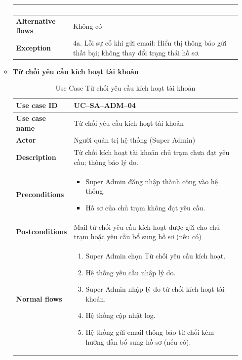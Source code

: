 \begin{enumerate}[label=\textbf{\alph*)}]
\begin{itemize}
\begin{center}
\begin{longtable}{|m{}|m{}|}
\begin{enumerate}[label=\arabic*.]
          \end{enumerate}\\
          \hline
          \textbf{Alternative flows} &
          Không có\\
          \hline
          \textbf{Exception} &
          4a. Lỗi sự cố khi gửi email: Hiển thị thông báo gửi thất bại; không thay đổi trạng thái hồ sơ.\\
          \hline
          \end{longtable}
      \end{center}
    \item \textbf{Từ chối yêu cầu kích hoạt tài khoản}
      \begin{center}
        \renewcommand{\arraystretch}{1.5}
        \begin{longtable}{|m{}|m{}|}
          \caption{Use Case Từ chối yêu cầu kích hoạt tài khoản}
          \label{tab:uc_sa_adm_04} \\
          \hline
          \textbf{Use case ID} & UC--SA--ADM--04 \\
          \hline
          \textbf{Use case name} & Từ chối yêu cầu kích hoạt tài khoản \\
          \hline
          \textbf{Actor} & Người quản trị hệ thống (Super Admin) \\
          \hline
          \textbf{Description} & Từ chối kích hoạt tài khoản chủ trạm chưa đạt yêu cầu; thông báo lý do. \\
          \hline
          \textbf{Preconditions} &
          \begin{itemize}
            \item Super Admin đăng nhập thành công vào hệ thống.
            \item Hồ sơ của chủ trạm không đạt yêu cầu.
          \end{itemize}\\
          \hline
          \textbf{Postconditions} &
          Mail từ chối yêu cầu kích hoạt được gửi cho chủ trạm hoặc yêu cầu bổ sung hồ sơ (nếu có)\\
          \hline
          \textbf{Normal flows} &
          \begin{enumerate}[label=\arabic*.]
            \item Super Admin chọn Từ chối yêu cầu kích hoạt.
            \item Hệ thống yêu cầu nhập lý do.
            \item Super Admin nhập lý do từ chối kích hoạt tài khoản.
            \item Hệ thống cập nhật log.
            \item Hệ thống gửi email thông báo từ chối kèm hướng dẫn bổ sung hồ sơ (nếu có).


\end{enumerate}
\end{longtable}
\end{center}
\end{itemize}
\end{enumerate}
